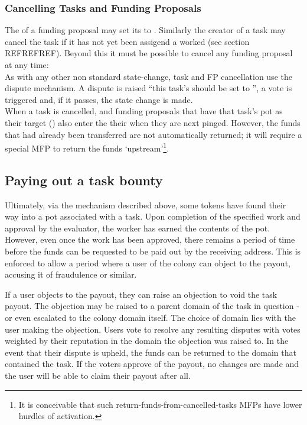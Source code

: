 \subsubsection{Cancelling Tasks and Funding Proposals}
The  of a funding proposal may set its  to . Similarly the creator of a task may cancel the task if it has not yet been assigend a worked (see section REFREFREF). Beyond this it must be possible to cancel any funding proposal at any time:\\
As with any other non standard state-change, task and FP cancellation use the dispute mechanism. A dispute is raised ``this task's  should be set to '', a vote is triggered and, if it passes, the state change is made.\\
When a task is cancelled, and funding proposals that have that task's pot as their target () also enter the  their  when they are next pinged. However, the funds that had already been transferred are not automatically returned; it will require a special MFP to return the funds `upstream'\footnote{It is conceivable that such return-funds-from-cancelled-tasks MFPs have lower hurdles of activation.}.

\subsection{Paying out a task bounty}\label{sec:claiming-bounty}
Ultimately, via the mechanism described above, some tokens have found their way into a pot associated with a task. Upon completion of the specified work and approval by the evaluator, the worker has earned the contents of the pot. However, even once the work has been approved, there remains a period of time before the funds can be requested to be paid out by the receiving address. This is enforced to allow a period where a user of the colony can object to the payout, accusing it of fraudulence or similar.

If a user objects to the payout, they can raise an objection to void the task payout. The objection may be raised to a parent domain of the task in question - or even escalated to the colony domain itself. The choice of domain lies with the user making the objection. Users vote to resolve any resulting disputes with votes weighted by their reputation in the domain the objection was raised to. In the event that their dispute is upheld, the funds can be returned to the domain that contained the task. If the voters approve of the payout, no changes are made and the user will be able to claim their payout after all.

